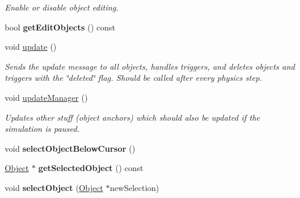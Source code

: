 \begin{DoxyCompactItemize}
\begin{DoxyCompactList}\small\item\em \-Enable or disable object editing. \end{DoxyCompactList}\item 
\hypertarget{classObjectManager_a5977e3a568570d02b52c61cf95206df4}{
bool {\bfseries get\-Edit\-Objects} () const }
\label{d6/d6f/classObjectManager_a5977e3a568570d02b52c61cf95206df4}

\item 
\hypertarget{classObjectManager_acbe50d32193f57b9dcfcb79beaccf155}{
void \hyperlink{classObjectManager_acbe50d32193f57b9dcfcb79beaccf155}{update} ()}
\label{d6/d6f/classObjectManager_acbe50d32193f57b9dcfcb79beaccf155}

\begin{DoxyCompactList}\small\item\em \-Sends the update message to all objects, handles triggers, and deletes objects and triggers with the \char`\"{}deleted\char`\"{} flag. \-Should be called after every physics step. \end{DoxyCompactList}\item 
\hypertarget{classObjectManager_a6052a1ffb8d47ae64fb4739db613e7ef}{
void \hyperlink{classObjectManager_a6052a1ffb8d47ae64fb4739db613e7ef}{update\-Manager} ()}
\label{d6/d6f/classObjectManager_a6052a1ffb8d47ae64fb4739db613e7ef}

\begin{DoxyCompactList}\small\item\em \-Updates other stuff (object anchors) which should also be updated if the simulation is paused. \end{DoxyCompactList}\item 
\hypertarget{classObjectManager_ad422a4b2f4819fd388b623001e5544c8}{
void {\bfseries select\-Object\-Below\-Cursor} ()}
\label{d6/d6f/classObjectManager_ad422a4b2f4819fd388b623001e5544c8}

\item 
\hypertarget{classObjectManager_a04e89e381b554f81476af68a9172b4b3}{
\hyperlink{classObject}{\-Object} $\ast$ {\bfseries get\-Selected\-Object} () const }
\label{d6/d6f/classObjectManager_a04e89e381b554f81476af68a9172b4b3}

\item 
\hypertarget{classObjectManager_aaa10a5d36fd5e3c610aa8eb06b11804f}{
void {\bfseries select\-Object} (\hyperlink{classObject}{\-Object} $\ast$new\-Selection)}
\label{d6/d6f/classObjectManager_aaa10a5d36fd5e3c610aa8eb06b11804f}


\end{DoxyCompactItemize}
